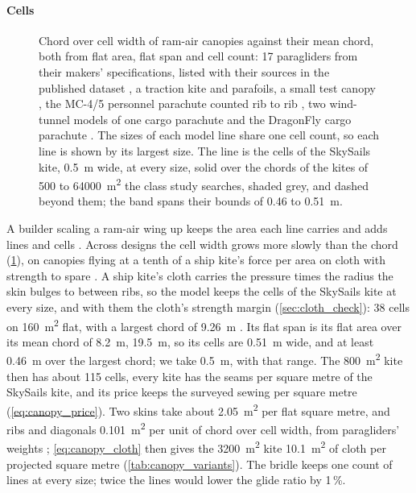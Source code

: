 \paragraph{Cells}
\label{app:canopy_cells}
\begin{figure}[tbp]
\centering
{}
\caption{Chord over cell width of ram-air canopies against their mean chord, both from flat area, flat span and cell count: 17 paragliders from their makers' specifications, listed with their sources in the published dataset \citep{windshipopt_data}, a traction kite \citep{flysurfer_soul4} and parafoils, a small test canopy \citep{gavrilovski2012}, the MC-4/5 personnel parachute counted rib to rib \citep{schairer2019}, two wind-tunnel models of one cargo parachute \citep{geiger1990} and the DragonFly cargo parachute \citep{airborne_dragonfly}. The sizes of each model line share one cell count, so each line is shown by its largest size. The line is the cells of the SkySails kite, \SI{0.5}{m} wide, at every size, solid over the chords of the kites of 500 to \SI{64000}{m^2} the class study searches, shaded grey, and dashed beyond them; the band spans their bounds of 0.46 to \SI{0.51}{m}.}
\label{fig:canopy_cells}
\end{figure}
A builder scaling a ram-air wing up keeps the area each line carries and adds lines and cells \citep{dunker2013}. Across designs the cell width grows more slowly than the chord (\cref{fig:canopy_cells}), on canopies flying at a tenth of a ship kite's force per area on cloth with strength to spare \citep{porcher2006skytex_tds}. A ship kite's cloth carries the pressure times the radius the skin bulges to between ribs, so the model keeps the cells of the SkySails kite at every size, and with them the cloth's strength margin (\cref{sec:cloth_check}): 38 cells on \SI{160}{m^2} flat, with a largest chord of \SI{9.26}{m} \citep[Table~1 and Sec.~2.2]{folkersma2020}. Its flat span is its flat area over its mean chord of \SI{8.2}{m}, \SI{19.5}{m}, so its cells are \SI{0.51}{m} wide, and at least \SI{0.46}{m} over the largest chord; we take \SI{0.5}{m}, with that range. The \SI{800}{m^2} kite then has about 115 cells, every kite has the seams per square metre of the SkySails kite, and its price keeps the surveyed sewing per square metre (\cref{eq:canopy_price}). Two skins take about \SI{2.05}{m^2} per flat square metre, and ribs and diagonals \SI{0.101}{m^2} per unit of chord over cell width, from paragliders' weights \citep{advance_alpha8,nova_prion,nova_mentor2}; \cref{eq:canopy_cloth} then gives the \SI{3200}{m^2} kite \SI{10.1}{m^2} of cloth per projected square metre (\cref{tab:canopy_variants}). The bridle keeps one count of lines at every size; twice the lines would lower the glide ratio by 1\,\%.

